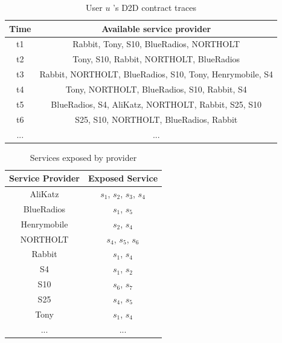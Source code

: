 \documentclass[journal]{IEEEtran}
\begin{document}
\begin{table}[!t]
\renewcommand{\arraystretch}{1.5}
\caption{User $u$ 's D2D contract traces}
\label{D2D contract traces}
\centering
\begin{tabular}{c c}
\hline
\bfseries Time & \bfseries Available service provider\\
\hline
t1 & Rabbit, Tony, S10, BlueRadios, NORTHOLT\\
t2 & Tony, S10, Rabbit, NORTHOLT, BlueRadios\\
t3 & Rabbit, NORTHOLT, BlueRadios, S10, Tony, Henrymobile, S4 \\
t4 & Tony, NORTHOLT, BlueRadios, S10, Rabbit, S4\\
t5 & BlueRadios, S4, AliKatz, NORTHOLT, Rabbit, S25, S10\\
t6 & S25, S10, NORTHOLT, BlueRadios, Rabbit\\
... & ...\\
\hline
\end{tabular}
\end{table}

\begin{table}[!t]
\renewcommand{\arraystretch}{1.3}
\caption{Services exposed by provider}
\label{Services exposed by provider}
\centering
\begin{tabular}{c c}
\hline
\bfseries Service Provider & \bfseries Exposed Service\\
\hline
AliKatz     & $s_1$, $s_2$, $s_3$, $s_4$\\
BlueRadios  & $s_1$, $s_5$\\
Henrymobile & $s_2$, $s_4$\\
NORTHOLT    & $s_4$, $s_5$, $s_6$ \\
Rabbit      & $s_1$, $s_4$\\
S4          & $s_1$, $s_2$\\
S10         & $s_6$, $s_7$\\
S25         & $s_4$, $s_5$\\
Tony        & $s_1$, $s_4$\\
... & ...\\
\hline
\end{tabular}
\end{table}
\end{document}
